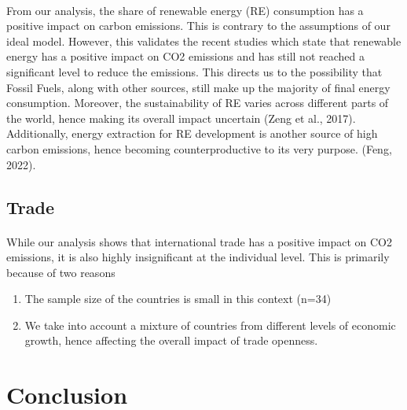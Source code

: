 \documentclass[12pt]{article}
\begin{document}
\paragraph{}
From our analysis, the share of renewable energy (RE) consumption has a positive impact on carbon emissions. This is contrary to the assumptions of our ideal model. However, this validates the recent studies which state that renewable energy has a positive impact on CO2 emissions and has still not reached a significant level to reduce the emissions. This directs us to the possibility that Fossil Fuels, along with other sources, still make up the majority of final energy consumption. Moreover, the sustainability of RE varies across different parts of the world, hence making its overall impact uncertain (Zeng et al., 2017). Additionally, energy extraction for RE development is another source of high carbon emissions, hence becoming counterproductive to its very purpose. (Feng, 2022).



\subsection{Trade}
\paragraph{}
While our analysis shows that international trade has a positive impact on CO2 emissions, it is also highly insignificant at the individual level. This is primarily because of two reasons
\begin{enumerate}
    \item The sample size of the countries is small in this context (n=34)
    \item We take into account a mixture of countries from different levels of economic growth, hence affecting the overall impact of trade openness.
\end{enumerate}


\section{Conclusion}
\end{document}
